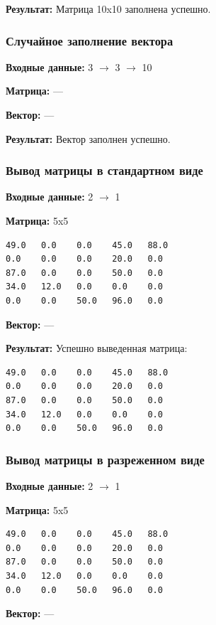 \documentclass[a4paper,12pt]{extarticle}
\begin{document}
\textbf{Результат: }
Матрица 10x10 заполнена успешно.
\subsubsection{Случайное заполнение вектора}

\textbf{Входные данные: }
3 $\rightarrow$ 3 $\rightarrow$ 10

\textbf{Матрица: }
---

\textbf{Вектор: }
---

\textbf{Результат: }
Вектор заполнен успешно.

\subsubsection{Вывод матрицы в стандартном виде}

\textbf{Входные данные: }
2 $\rightarrow$ 1

\textbf{Матрица: }
5x5

\begin{verbatim}
49.0   0.0    0.0    45.0   88.0 
0.0    0.0    0.0    20.0   0.0   
87.0   0.0    0.0    50.0   0.0  
34.0   12.0   0.0    0.0    0.0 
0.0    0.0    50.0   96.0   0.0
\end{verbatim}


\textbf{Вектор: }
---


\textbf{Результат: }
Успешно выведенная матрица:

\begin{verbatim}
49.0   0.0    0.0    45.0   88.0 
0.0    0.0    0.0    20.0   0.0   
87.0   0.0    0.0    50.0   0.0  
34.0   12.0   0.0    0.0    0.0 
0.0    0.0    50.0   96.0   0.0
\end{verbatim}

\subsubsection{Вывод матрицы в разреженном виде}

\textbf{Входные данные: }
2 $\rightarrow$ 1

\textbf{Матрица: }
5x5

\begin{verbatim}
49.0   0.0    0.0    45.0   88.0 
0.0    0.0    0.0    20.0   0.0   
87.0   0.0    0.0    50.0   0.0  
34.0   12.0   0.0    0.0    0.0 
0.0    0.0    50.0   96.0   0.0
\end{verbatim}


\textbf{Вектор: }
---
\end{document}
